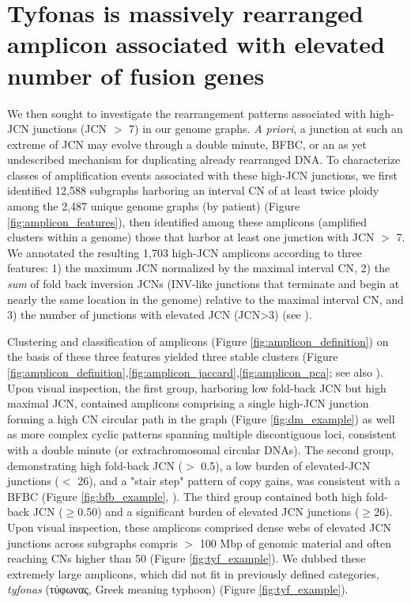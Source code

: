 \documentclass[phd,tocprelim]{cornell}
\begin{document}
\section{Tyfonas is massively rearranged amplicon associated with elevated number of fusion genes}
We then sought to investigate the rearrangement patterns associated with high-JCN junctions (JCN $>$ 7) in our genome graphs.  \textit{A priori}, a junction at such an extreme of JCN may evolve through a double minute, BFBC, or an as yet undescribed mechanism for duplicating already rearranged DNA. To characterize classes of  amplification events associated with these high-JCN junctions, we first identified 12,588 subgraphs harboring an interval CN of at least twice ploidy among the 2,487 unique genome graphs (by patient) (Figure \ref{fig:amplicon_features}), then identified among these amplicons (amplified clusters within a genome) those that harbor at least one junction with JCN $>$ 7.  We annotated the resulting 1,703 high-JCN amplicons according to three features: 1) the maximum JCN normalized by the maximal interval CN, 2) the \textit{sum} of fold back inversion JCNs (INV-like junctions that terminate and begin at nearly the same location in the genome) relative to the maximal interval CN, and 3) the number of junctions with elevated JCN (JCN>3) (see ).

Clustering and classification of amplicons (Figure \ref{fig:amplicon_definition}) on the basis of these three features yielded three stable clusters (Figure \ref{fig:amplicon_definition},\ref{fig:amplicon_jaccard},\ref{fig:amplicon_pca}; see also ).  Upon visual inspection, the first group, harboring low fold-back JCN but high maximal JCN, contained amplicons comprising a single high-JCN junction forming a high CN circular path in the graph (Figure \ref{fig:dm_example}) as well as more complex cyclic patterns spanning multiple discontiguous loci, consistent with a double minute (or extrachromosomal circular DNAs).  The second group, demonstrating high fold-back JCN ($>$ 0.5), a low burden of elevated-JCN junctions ($<$ 26), and a "stair step" pattern of copy gains, was consistent with a BFBC (Figure \ref{fig:bfb_example}, \cite{Zakov:2013cm,McClintock1939-oi}). The third group contained both high fold-back JCN ($\geq$0.50) and a significant burden of elevated JCN junctions ($\geq$26).  Upon visual inspection, these amplicons comprised dense webs of elevated  JCN junctions across subgraphs compris $>$ 100 Mbp of genomic material and often reaching CNs higher than 50 (Figure \ref{fig:tyf_example}).  We dubbed these extremely large amplicons, which did not fit in previously defined categories, \textit{tyfonas} (τύφωνας, Greek meaning typhoon) (Figure \ref{fig:tyf_example}).
\end{document}
